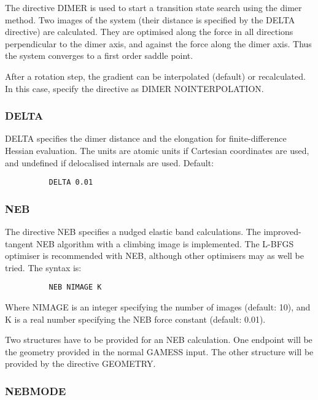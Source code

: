 \documentclass[11pt,fleqn]{article}
\begin{document}
The directive DIMER is used to start a transition state search using the dimer
method. Two images of the system (their distance is specified by the DELTA
directive) are calculated. They are optimised along the force in all
directions perpendicular to the dimer axis, and against the force along the
dimer axis. Thus the system converges to a first order saddle point.

After a rotation step, the gradient can be interpolated (default) or
recalculated. In this case, specify the directive as DIMER NOINTERPOLATION.

\subsubsection{DELTA}

DELTA specifies the dimer distance and the elongation for finite-difference
Hessian evaluation. The units are atomic units if Cartesian coordinates are
used, and undefined if delocalised internals are used. Default:

{
\footnotesize
\begin{verbatim}
          DELTA 0.01
\end{verbatim}
}

\subsubsection{NEB}

The directive NEB specifies a nudged elastic band calculations. The
improved-tangent NEB algorithm with a climbing image is implemented. The
L-BFGS optimiser is recommended with NEB, although other optimisers may as
well be tried. The syntax is:

{
\footnotesize
\begin{verbatim}
          NEB NIMAGE K
\end{verbatim}
}

Where NIMAGE is an integer specifying the number of images (default: 10), and
K is a real number specifying the NEB force constant (default: 0.01).

Two structures have to be provided for an NEB calculation. One endpoint will
be the geometry provided in the normal GAMESS input. The other structure will
be provided by the directive GEOMETRY.

\subsubsection{NEBMODE}
\end{document}
